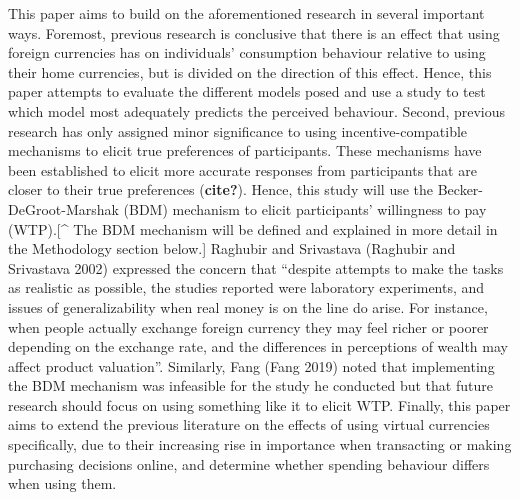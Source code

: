 \documentclass[
]{report}
\begin{document}
This paper aims to build on the aforementioned research in several
important ways. Foremost, previous research is conclusive that there is
an effect that using foreign currencies has on individuals' consumption
behaviour relative to using their home currencies, but is divided on the
direction of this effect. Hence, this paper attempts to evaluate the
different models posed and use a study to test which model most
adequately predicts the perceived behaviour. Second, previous research
has only assigned minor significance to using incentive-compatible
mechanisms to elicit true preferences of participants. These mechanisms
have been established to elicit more accurate responses from
participants that are closer to their true preferences (\textbf{cite?}).
Hence, this study will use the Becker-DeGroot-Marshak (BDM) mechanism to
elicit participants' willingness to pay (WTP).{[}\^{} The BDM mechanism
will be defined and explained in more detail in the Methodology section
below.{]} Raghubir and Srivastava (Raghubir and Srivastava 2002)
expressed the concern that ``despite attempts to make the tasks as
realistic as possible, the studies reported were laboratory experiments,
and issues of generalizability when real money is on the line do arise.
For instance, when people actually exchange foreign currency they may
feel richer or poorer depending on the exchange rate, and the
differences in perceptions of wealth may affect product valuation''.
Similarly, Fang (Fang 2019) noted that implementing the BDM mechanism
was infeasible for the study he conducted but that future research
should focus on using something like it to elicit WTP. Finally, this
paper aims to extend the previous literature on the effects of using
virtual currencies specifically, due to their increasing rise in
importance when transacting or making purchasing decisions online, and
determine whether spending behaviour differs when using them.
\end{document}
